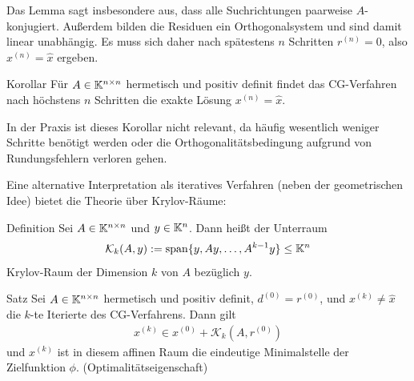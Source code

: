 Das Lemma sagt insbesondere aus, dass alle Suchrichtungen paarweise $A$-konjugiert. Außerdem bilden 
die Residuen ein Orthogonalsystem und sind damit linear unabhängig.
Es muss sich daher nach spätestens $n$ Schritten $r^{(n)}=0$, also $x^{(n)}=\hat{x}$ ergeben.

\begin{colbox}{Korollar}\label{cor:CGVconvn}
  Für $A\in\mathbb K^{n\times n}$ hermetisch und positiv definit findet das CG-Verfahren nach 
  höchstens $n$ Schritten die exakte Lösung $x^{(n)}=\hat{x}$.
\end{colbox}

In der Praxis ist dieses Korollar nicht relevant, da häufig wesentlich weniger Schritte benötigt werden oder die 
Orthogonalitätsbedingung aufgrund von Rundungsfehlern verloren gehen.

Eine alternative Interpretation als iteratives Verfahren (neben der geometrischen Idee) bietet die Theorie über 
Krylov-Räume:

\begin{colbox}{Definition}
  Sei $A\in\mathbb K^{n\times n}$ und $y\in\mathbb K^n$. Dann heißt der Unterraum 
  \begin{align*}
    \mathcal{K}_k(A,y) := \operatorname*{span}\{y,Ay,\dots,A^{k-1}y\}\leq \mathbb K^n
  \end{align*} 
  Krylov-Raum der Dimension $k$ von $A$ bezüglich $y$.
\end{colbox}

\begin{colbox}{Satz}\label{satz:CGVkrylov}
  Sei $A\in\mathbb K^{n\times n}$ hermetisch und positiv definit, $d^{(0)}=r^{(0)}$, und $x^{(k)}\neq \hat{x}$ 
  die $k$-te Iterierte des CG-Verfahrens. 
  Dann gilt 
  \begin{align*}
    x^{(k)}\in x^{(0)} + \mathcal{K}_k(A,r^{(0)})
  \end{align*}
  und $x^{(k)}$ ist 
  in diesem affinen Raum die eindeutige Minimalstelle der Zielfunktion $\phi$. (Optimalitätseigenschaft)
\end{colbox}

